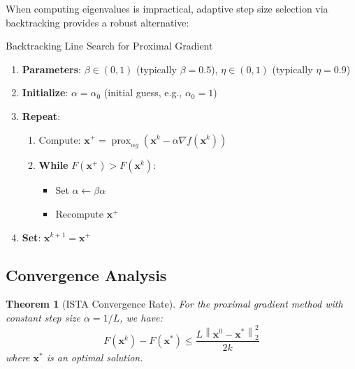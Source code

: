 \documentclass[12pt]{article}
\renewcommand{\vec}[1]{\mathbf{#1}}
\DeclareMathOperator{\prox}{prox}
\newcommand{\norm}[1]{\left\lVert#1\right\rVert}
\newtheorem{theorem}{Theorem}[section]
\begin{document}
When computing eigenvalues is impractical, adaptive step size selection via backtracking provides a robust alternative:

\begin{algorithm}
    \caption{Backtracking Line Search for Proximal Gradient}
    \begin{enumerate}
        \item \textbf{Parameters}: $\beta \in (0, 1)$ (typically $\beta = 0.5$), $\eta \in (0, 1)$ (typically $\eta = 0.9$)
        \item \textbf{Initialize}: $\alpha = \alpha_0$ (initial guess, e.g., $\alpha_0 = 1$)
        \item \textbf{Repeat}:
              \begin{enumerate}[label=(\alph*)]
                  \item Compute: $\vec{x}^+ = \prox_{\alpha g}(\vec{x}^k - \alpha \nabla f(\vec{x}^k))$
                  \item \textbf{While} $F(\vec{x}^+) > F(\vec{x}^k)$:
                        \begin{itemize}
                            \item Set $\alpha \leftarrow \beta \alpha$
                            \item Recompute $\vec{x}^+$
                        \end{itemize}
              \end{enumerate}
        \item \textbf{Set}: $\vec{x}^{k+1} = \vec{x}^+$
    \end{enumerate}
\end{algorithm}

\subsection{Convergence Analysis}

\begin{theorem}[ISTA Convergence Rate]
    For the proximal gradient method with constant step size $\alpha = 1/L$, we have:
    \begin{equation}
        F(\vec{x}^k) - F(\vec{x}^*) \leq \frac{L\norm{\vec{x}^0 - \vec{x}^*}_2^2}{2k}
    \end{equation}
    where $\vec{x}^*$ is an optimal solution.
\end{theorem}

\end{document}
